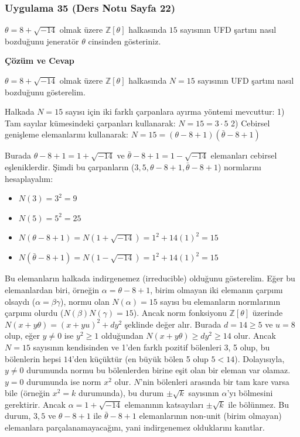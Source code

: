 \documentclass[11pt, a4paper]{article}
\newenvironment{cozum}{
    \vspace{0.5cm}
    \noindent\textcolor{green!60!black}{\faCheckCircle\enspace \textbf{\Large Çözüm ve Cevap}}\par\vspace{0.2cm}
}{}
\begin{document}
\subsubsection{Uygulama 35 (Ders Notu Sayfa 22)}
\begin{sorubox}
$\theta = 8 + \sqrt{-14}$ olmak üzere $\mathbb{Z}[\theta]$ halkasında $15$ sayısının UFD şartını nasıl bozduğunu jeneratör $\theta$ cinsinden gösteriniz.
\end{sorubox}
\begin{cozum}
$\theta = 8 + \sqrt{-14}$ olmak üzere $\mathbb{Z}[\theta]$ halkasında $N = 15$ sayısının UFD şartını nasıl bozduğunu gösterelim.

Halkada $N = 15$ sayısı için iki farklı çarpanlara ayırma yöntemi mevcuttur:
1) Tam sayılar kümesindeki çarpanları kullanarak: $N = 15 = 3 \cdot 5$
2) Cebirsel genişleme elemanlarını kullanarak: $N = 15 = (\theta - 8 + 1)(\bar{\theta} - 8 + 1)$

Burada $\theta - 8 + 1 = 1 + \sqrt{-14}$ ve $\bar{\theta} - 8 + 1 = 1 - \sqrt{-14}$ elemanları cebirsel eşleniklerdir. Şimdi bu çarpanların ($3, 5, \theta - 8 + 1, \bar{\theta} - 8 + 1$) normlarını hesaplayalım:
\begin{itemize}
    \item $N(3) = 3^2 = 9$
    \item $N(5) = 5^2 = 25$
    \item $N(\theta - 8 + 1) = N(1 + \sqrt{-14}) = 1^2 + 14(1)^2 = 15$
    \item $N(\bar{\theta} - 8 + 1) = N(1 - \sqrt{-14}) = 1^2 + 14(1)^2 = 15$
\end{itemize}

Bu elemanların halkada indirgenemez (irreducible) olduğunu gösterelim. Eğer bu elemanlardan biri, örneğin $\alpha = \theta - 8 + 1$, birim olmayan iki elemanın çarpımı olsaydı ($\alpha = \beta \gamma$), normu olan $N(\alpha) = 15$ sayısı bu elemanların normlarının çarpımı olurdu ($N(\beta)N(\gamma) = 15$). Ancak norm fonksiyonu $\mathbb{Z}[\theta]$ üzerinde $N(x+y\theta) = (x+yu)^2 + dy^2$ şeklinde değer alır. Burada $d = 14 \ge 5$ ve $u = 8$ olup, eğer $y \neq 0$ ise $y^2 \ge 1$ olduğundan $N(x+y\theta) \ge dy^2 \ge 14$ olur. Ancak $N = 15$ sayısının kendisinden ve 1'den farklı pozitif bölenleri 3, 5 olup, bu bölenlerin hepsi $14$'den küçüktür (en büyük bölen 5 olup $5 < 14$). Dolayısıyla, $y \neq 0$ durumunda normu bu bölenlerden birine eşit olan bir eleman var olamaz. $y = 0$ durumunda ise norm $x^2$ olur. $N$'nin bölenleri arasında bir tam kare varsa bile (örneğin $x^2 = k$ durumunda), bu durum $\pm \sqrt{k}$ sayısının $\alpha$'yı bölmesini gerektirir. Ancak $\alpha = 1+\sqrt{-14}$ elemanının katsayıları $\pm \sqrt{k}$ ile bölünmez. Bu durum, $3, 5$ ve $\theta - 8 + 1$ ile $\bar{\theta} - 8 + 1$ elemanlarının non-unit (birim olmayan) elemanlara parçalanamayacağını, yani indirgenemez olduklarını kanıtlar.


\end{cozum}
\end{document}
